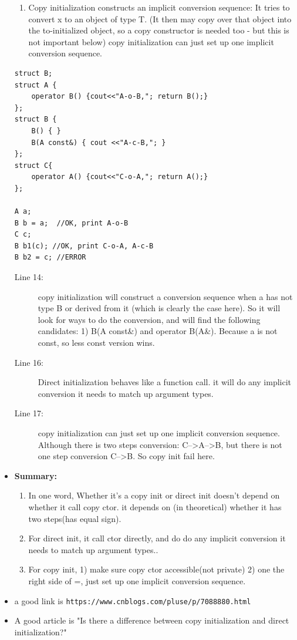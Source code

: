 \documentclass[a4paper,11pt,twoside]{book}
\begin{document}
\begin{itemize}
\begin{enumerate}
		\item Copy initialization constructs an implicit conversion sequence: It tries to convert x to an object of type T. (It then may copy over that object into the to-initialized object, so a copy constructor is needed too - but this is not important below) copy initialization can just set up one implicit conversion sequence.
	\end{enumerate}
\begin{lstlisting}
struct B;
struct A { 
	operator B() {cout<<"A-o-B,"; return B();}
};
struct B { 
	B() { }
	B(A const&) { cout <<"A-c-B,"; }
};
struct C{
	operator A() {cout<<"C-o-A,"; return A();}
};
 
A a;
B b = a;  //OK, print A-o-B
C c;
B b1(c); //OK, print C-o-A, A-c-B
B b2 = c; //ERROR
\end{lstlisting}
\begin{description}
	\item[Line 14:]  copy initialization will construct a conversion sequence when a has not type B or derived from it (which is clearly the case here). So it will look for ways to do the conversion, and will find the following candidates: 1) B(A const\&) and operator B(A\&). Because a is not const, so less const version wins. 
	
	\item[Line 16:] Direct initialization behaves like a function call. it will do any implicit conversion it needs to match up argument types.
	
	\item[Line 17:] copy initialization can just set up one implicit conversion sequence. Although there is two steps conversion: C-->A-->B, but there is not one step conversion C-->B. So copy init fail here.
	
\end{description}


\item \textbf{Summary:}
\begin{enumerate}
	\item In one word, Whether it's a copy init or direct init doesn't depend on whether it call copy ctor.  it depends on (in theoretical) whether it has two steps(has equal sign).
	
	\item For direct init, it call ctor directly, and do do any implicit conversion it needs to match up argument types..
	
	\item For copy init, 1) make sure copy ctor accessible(not private) 2) one the right side of =, just set up one implicit conversion sequence.
\end{enumerate}

		
\item a good link is \verb|https://www.cnblogs.com/pluse/p/7088880.html|
\item A good article is "Is there a difference between copy initialization and direct initialization?"

	
\end{itemize}
\end{document}
